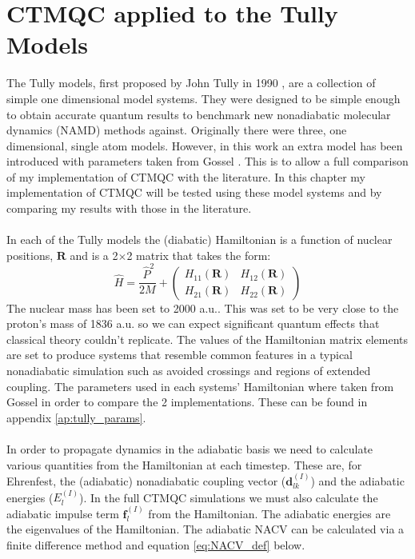\chapter{CTMQC applied to the Tully Models}
\label{chap:tully_models}

The Tully models, first proposed by John Tully in 1990 \cite{tully_molecular_1990}, are a collection of simple one dimensional model systems. They were designed to be simple enough to obtain accurate quantum results to benchmark new nonadiabatic molecular dynamics (NAMD) methods against. Originally there were three, one dimensional, single atom models. However, in this work an extra model has been introduced with parameters taken from Gossel \cite{gossel_coupled-trajectory_2018}. This is to allow a full comparison of my implementation of CTMQC with the literature. In this chapter my implementation of CTMQC will be tested using these model systems and by comparing my results with those in the literature.
\\\\
In each of the Tully models the (diabatic) Hamiltonian is a function of nuclear positions, $\mathbf{R}$ and is a 2$\times$2 matrix that takes the form:
\begin{equation}
  \hat{H} = \frac{\ \hat{P} ^2}{2M} + \left(
                                              \begin{array}{cc}
                                                H_{11}(\mathbf{R}) & H_{12}(\mathbf{R}) \\
                                                H_{21}(\mathbf{R}) & H_{22}(\mathbf{R})
                                              \end{array}
                                         \right)
\end{equation}
The nuclear mass has been set to 2000 a.u.. This was set to be very close to the proton's mass of 1836 a.u. so we can expect significant quantum effects that classical theory couldn't replicate. The values of the Hamiltonian matrix elements are set to produce systems that resemble common features in a typical nonadiabatic simulation such as avoided crossings and regions of extended coupling. The parameters used in each systems' Hamiltonian where taken from Gossel \cite{gossel_coupled-trajectory_2018} in order to compare the 2 implementations. These can be found in appendix \ref{ap:tully_params}.
\\\\
In order to propagate dynamics in the adiabatic basis we need to calculate various quantities from the Hamiltonian at each timestep. These are, for Ehrenfest, the (adiabatic) nonadiabatic coupling vector ($\mathbf{d}_{lk}^{(I)}$) and the adiabatic energies ($E_{l}^{(I)}$). In the full CTMQC simulations we must also calculate the   adiabatic impulse  term $\mathbf{f}_{l}^{(I)}$ from the Hamiltonian. The adiabatic energies are the eigenvalues of the Hamiltonian. The adiabatic NACV can be calculated via a finite difference method and equation \eqref{eq:NACV_def} below.
